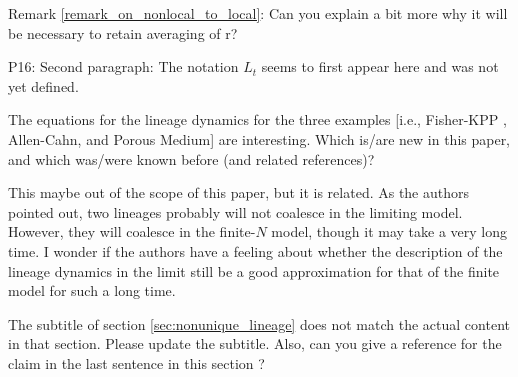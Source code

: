 \begin{point}{}
Remark \ref{remark_on_nonlocal_to_local}: Can you explain a bit more why it will be necessary to retain averaging of r?
\end{point}


\begin{point}{}
P16: Second paragraph:
The notation $L_t$ seems to first appear here and was not yet defined.
\end{point}


\begin{point}{}
    The equations for the lineage dynamics for the three examples [i.e., Fisher-KPP \revref, Allen-Cahn, and Porous Medium] are interesting.
Which is/are new in this paper, and which was/were known before (and related references)?
\end{point}


\begin{point}{}
This maybe out of the scope of this paper, but it is related. As the authors pointed out, two
lineages probably will not coalesce in the limiting model. However, they will coalesce in
the finite-$N$ model, though it may take a very long time. I wonder if the authors have a
feeling about whether the description of the lineage dynamics in the limit still be a good
approximation for that of the finite model for such a long time.
\end{point}


\begin{point}{}
The subtitle of section \ref{sec:nonunique_lineage} does not match the actual content in that section. Please
update the subtitle. Also, can you give a reference for the claim in the last sentence in this
section \revref?
\end{point}


